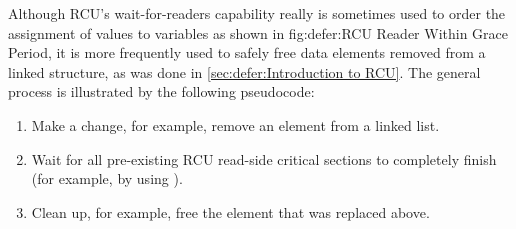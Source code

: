 Although RCU's wait-for-readers capability really is sometimes used to
order the assignment of values to variables as shown in
{fig:defer:RCU Reader Within Grace Period},
it is more frequently used to safely free data elements removed from
a linked structure, as was done in
\cref{sec:defer:Introduction to RCU}.
The general process is illustrated by the following pseudocode:

\begin{enumerate}
\item	Make a change, for example, remove an element from a linked list.
\item	Wait for all pre-existing RCU read-side critical sections to
	completely finish (for example, by using
	).
\item	Clean up, for example, free the element that was replaced above.
\end{enumerate}

